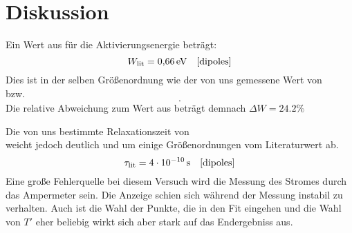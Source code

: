 \section{Diskussion}\label{sec:Diskussion}


Ein Wert aus \cite{dipoles} für die Aktivierungsenergie beträgt:
\begin{equation}
  W_\text{lit} = \SI{0.66}{\electronvolt} \quad \text{\cite{dipoles}}
\end{equation}
Dies ist in der selben Größenordnung wie der von uns gemessene Wert von
\begin{equation}
  
\end{equation}
bzw.
\begin{equation}
   .
\end{equation}
Die relative Abweichung zum Wert aus \cite{dipoles} beträgt demnach $\Delta W = 24.2 \%$



Die von uns bestimmte Relaxationszeit von
\begin{equation}
  
\end{equation}
 weicht jedoch deutlich und um einige Größenordnungen vom Literaturwert ab.
\begin{equation}
  \tau_\text{lit} = \SI{4E-10}{\second} \quad \text{\cite{dipoles}}
\end{equation}
Eine große Fehlerquelle bei diesem Versuch wird die Messung des Stromes durch das
Ampermeter sein.
Die Anzeige schien sich während der Messung instabil zu verhalten.
Auch ist die Wahl der Punkte, die in den Fit eingehen und die Wahl von $T'$ eher beliebig wirkt sich aber stark auf das Endergebniss aus.
